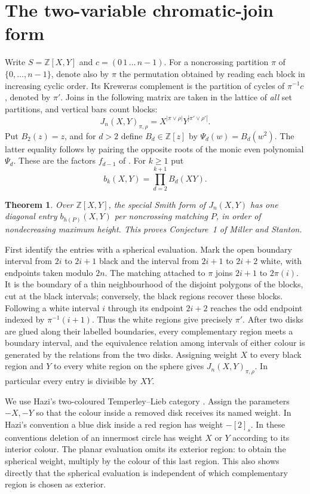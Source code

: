 \documentclass[11pt]{article}
\newtheorem{theorem}{Theorem}
\newcommand{\ZZ}{\mathbb Z}
\begin{document}
\section{The two-variable chromatic-join form}
\label{sec:two-colour}

Write \(S=\ZZ[X,Y]\) and \(c=(0\,1\,\dots\,n-1)\). For a noncrossing
partition \(\pi\) of \(\{0,\dots,n-1\}\), denote also by \(\pi\) the
permutation obtained by reading each block in increasing cyclic order.
Its Kreweras complement is the partition of cycles of \(\pi^{-1}c\),
denoted by \(\pi'\). Joins in the following matrix are taken in the
lattice of \emph{all} set partitions, and vertical bars count blocks:
\[
 J_n(X,Y)_{\pi,\rho}=X^{|\pi\vee\rho|}Y^{|\pi'\vee\rho'|}.
\]
Put \(B_2(z)=z\), and for \(d>2\) define \(B_d\in\ZZ[z]\) by
\(\Psi_d(w)=B_d(w^2)\). The latter equality follows by pairing the
opposite roots of the monic even polynomial \(\Psi_d\). These are
the factors \(f_{d-1}\) of \cite[\S6.2.2]{ms}. For \(k\ge1\) put
\[
                     b_k(X,Y)=\prod_{d=2}^{k+1} B_d(XY).
\]

\begin{theorem}\label{thm:two-colour}
Over \(\ZZ[X,Y]\), the special Smith form of \(J_n(X,Y)\) has one
diagonal entry \(b_{h(P)}(X,Y)\) per noncrossing matching \(P\),
in order of nondecreasing maximum height. This proves
Conjecture~1 of Miller and Stanton.
\end{theorem}

First identify the entries with a spherical evaluation. Mark the
open boundary interval from \(2i\) to \(2i+1\) black and the interval
from \(2i+1\) to \(2i+2\) white, with endpoints taken modulo \(2n\).
The matching attached to \(\pi\) joins \(2i+1\) to \(2\pi(i)\).
It is the boundary of a thin neighbourhood of the disjoint polygons
of the blocks, cut at the black intervals; conversely, the black
regions recover these blocks. Following a white interval \(i\)
through its endpoint \(2i+2\) reaches the odd endpoint indexed
by \(\pi^{-1}(i+1)\). Thus the white regions give precisely \(\pi'\).
After two disks are glued along their labelled boundaries, every
complementary region meets a boundary interval, and the equivalence
relation among intervals of either colour is generated by the
relations from the two disks. Assigning weight \(X\) to every black
region and \(Y\) to every white region on the sphere gives
\(J_n(X,Y)_{\pi,\rho}\). In particular every entry is divisible by \(XY\).

We use Hazi's two-coloured Temperley--Lieb category
\cite[Theorem~A, equation~(7), Definition~3.3 and Lemma~3.5]{hazi}.
Assign the parameters \(-X,-Y\) so that the colour inside a removed disk receives its named weight. In Hazi's convention a blue disk inside a red region has weight \(-[2]_s\). In these conventions deletion of an
innermost circle has weight \(X\) or \(Y\) according to its interior
colour. The planar evaluation omits its exterior region: to obtain the
spherical weight, multiply by the colour of this last region. This
also shows directly that the spherical evaluation is independent of
which complementary region is chosen as exterior.
\end{document}
